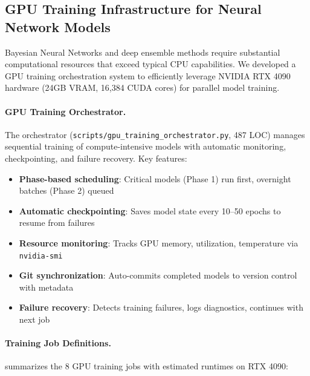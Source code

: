 
\subsection{GPU Training Infrastructure for Neural Network Models}
\label{subsec:gpu-training-infrastructure}

Bayesian Neural Networks and deep ensemble methods require substantial computational resources that exceed typical CPU capabilities.
We developed a GPU training orchestration system to efficiently leverage NVIDIA RTX 4090 hardware (24GB VRAM, 16,384 CUDA cores) for parallel model training.

\paragraph{GPU Training Orchestrator.}
The orchestrator (\texttt{scripts/gpu\_training\_orchestrator.py}, 487 LOC) manages sequential training of compute-intensive models with automatic monitoring, checkpointing, and failure recovery.
Key features:
\begin{itemize}
  \item \textbf{Phase-based scheduling}: Critical models (Phase 1) run first, overnight batches (Phase 2) queued
  \item \textbf{Automatic checkpointing}: Saves model state every 10--50 epochs to resume from failures
  \item \textbf{Resource monitoring}: Tracks GPU memory, utilization, temperature via \texttt{nvidia-smi}
  \item \textbf{Git synchronization}: Auto-commits completed models to version control with metadata
  \item \textbf{Failure recovery}: Detects training failures, logs diagnostics, continues with next job
\end{itemize}

\paragraph{Training Job Definitions.}
 summarizes the 8 GPU training jobs with estimated runtimes on RTX 4090:

